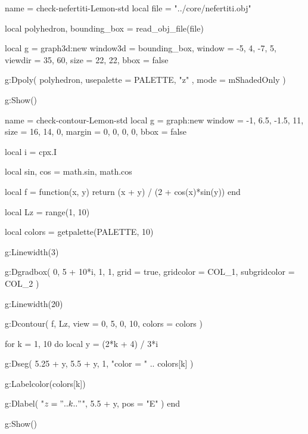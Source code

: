 \documentclass{tutodoc}
\newcommand{\PALETTE}{Lemon}
\begin{document}

\vfill

\begin{luadraw}{name = check-nefertiti-\PALETTE-std}
local file = "../core/nefertiti.obj"

local polyhedron, bounding_box = read_obj_file(file)

local g = graph3d:new{
  window3d = bounding_box,
  window   = {-5, 4, -7, 5},
  viewdir  = {35, 60},
  size     = {22, 22},
  bbox     = false
}

g:Dpoly(
  polyhedron,
  {
    usepalette = {PALETTE, "z" },
    mode       = mShadedOnly
  }
)

g:Show()
\end{luadraw}



\newpage

\begin{luadraw}{name = check-contour-\PALETTE-std}
local g = graph:new{
  window = {-1, 6.5, -1.5, 11},
  size   = {16, 14, 0},
  margin = {0, 0, 0, 0},
  bbox   = false
}

local i = cpx.I

local sin, cos = math.sin, math.cos

local f = function(x, y)
  return (x + y) / (2 + cos(x)*sin(y))
end

local Lz = range(1, 10)

local colors = getpalette(PALETTE, 10)

g:Linewidth(3)

g:Dgradbox(
  {0, 5 + 10*i, 1, 1},
  {
    grid         = true,
    gridcolor    = COL_1,
    subgridcolor = COL_2
  }
)

g:Linewidth(20)

g:Dcontour(
  f,
  Lz,
  {
    view   = {0, 5, 0, 10},
    colors = colors
  }
)

for k = 1, 10 do
  local y = (2*k + 4) / 3*i

  g:Dseg(
    {5.25 + y, 5.5 + y},
    1,
    "color = " .. colors[k]
  )

  g:Labelcolor(colors[k])

  g:Dlabel(
    "$z = " .. k .. "$",
    5.5 + y,
    {pos = "E"}
  )
end

g:Show()
\end{luadraw}


\end{document}
